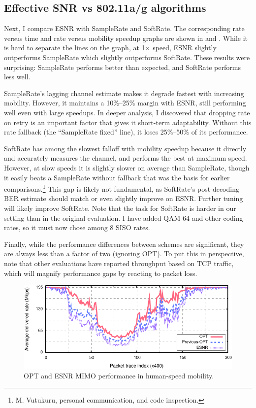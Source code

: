 \subsection{Effective SNR vs 802.11a/g algorithms}
Next, I compare ESNR with SampleRate and SoftRate. The corresponding rate versus time and rate versus mobility speedup graphs are shown 
in  and . While it is hard to separate the lines on the graph, at 1$\times$ speed, ESNR slightly outperforms SampleRate which slightly outperforms SoftRate. These results were surprising: SampleRate performs better than expected, and SoftRate performs less well. 


SampleRate's lagging channel estimate makes it degrade fastest with increasing mobility. However, it maintains a 10\%--25\% margin with ESNR, still performing well even with large speedups. In deeper analysis, I discovered that dropping rate on retry is an important factor that gives it short-term adaptability. Without this rate fallback (the ``SampleRate fixed'' line), it loses 25\%--50\% of its performance.

SoftRate has among the slowest falloff with mobility speedup because it directly and accurately measures the channel, and performs the best at maximum speed. However, at slow speeds it is slightly slower on average than SampleRate, though it easily beats a SampleRate without fallback that was the basis for earlier comparisons.\footnote{M. Vutukuru, personal communication, and code inspection.}
This gap is likely not fundamental, as SoftRate's post-decoding BER estimate should match or even slightly improve on ESNR. Further tuning will likely improve SoftRate. Note that the task for SoftRate is harder in our setting than in the original evaluation. I have added QAM-64 and other coding rates, so it must now chose among 8 SISO rates.

Finally, while the performance differences between schemes are significant, they are always less than a factor of two (ignoring OPT). To put this in perspective, note that other evaluations have reported throughput based on TCP traffic, which will magnify performance gaps by reacting to packet loss.

\begin{figure}[t]
      \centering
      \includegraphics[width=\textwidth]{figures/rate/mimo_skip_time.pdf}
      \caption{\label{fig:mimo_eff_snr_time} OPT and ESNR MIMO performance in human-speed mobility.}
\end{figure}

